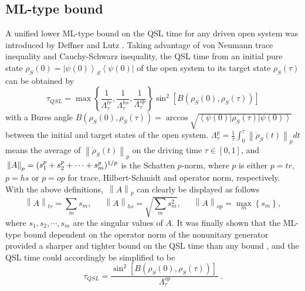 \documentclass[
showpacs,  %
showkeys,  %
aps,       %
amsthm,    %
amsmath,   %
amsfonts,  %
amssymb    %
]{revtex4-1}          %
\begin{document}
\subsection{ML-type bound}
\label{Subsec:31}
A unified lower ML-type bound on the QSL time for any driven open system was introduced by Deffner and Lutz \cite{Deffner2013}. Taking advantage of von Neumann trace inequality and Cauchy-Schwarz inequality, the QSL time from an initial pure state ${\rho _S}(0) = {\left| {\psi (0)} \right\rangle _S}\left\langle {\psi (0)} \right|$ of the open system to its target state ${\rho _S}(\tau)$ can be obtained by
\begin{equation}
\label{e13}
{\tau _{QSL}} = \max \left\{ {\frac{1}{{\Lambda _\tau ^{tr}}},\frac{1}{{\Lambda _\tau ^{hs}}},\frac{1}{{\Lambda _\tau ^{op}}}} \right\}{\sin ^2}\left[ {B({\rho _S}(0),{\rho _S}(\tau ))} \right]
\end{equation}
with a Bures angle $B({\rho _S}(0),{\rho _S}(\tau )) = \arccos \sqrt {\left\langle {\psi (0)} \right|{\rho _S}(\tau )\left| {\psi (0)} \right\rangle }$ between the initial and target states of the open system. $\Lambda _\tau ^p = \frac{1}{\tau }{\int_0^\tau  {\left\| {{{\dot \rho }_S}(t )} \right\|} _p}dt$ means the average of ${\left\| {{{\dot \rho }_S}(t )} \right\|_p}$ on the driving time $\tau  \in \left[ {0,1} \right]$, and $\,{\left\| A \right\|_p} = {(s _1^p + s _2^p +  \cdots  + s _m^p)^{{1 \mathord{\left/{\vphantom {1 p}} \right.\kern-\nulldelimiterspace} p}}}$ is the Schatten $p$-norm, where $p$ is either $p=tr$, $p=hs$ or $p=op$ for trace, Hilbert-Schmidt and operator norm, respectively. With the above definitions, $\,{\left\| A \right\|_p}$ can clearly be displayed as follows
\begin{equation}
\label{e14}
{\left\| A \right\|_{tr}} = \sum\limits_m {{s_m}} ,\,\,\,\,\,\,\,\,\,{\left\| A \right\|_{hs}} = \sqrt {\sum\limits_m {s_m^2} } ,\,\,\,\,\,\,\,\,\,{\left\| A \right\|_{op}} = \mathop {\max }\limits_m \left\{ {{s_m}} \right\},
\end{equation}
where ${s _1},{s _2},\cdots,{s _m}$ are the singular values of $A$. It was finally shown that the ML-type bound dependent on the operator norm of the nonunitary generator provided a sharper and tighter bound on the QSL time than any bound \cite{Deffner2013}, and the QSL time could accordingly be simplified to be
\begin{equation}
\label{e15}
{\tau _{QSL}} = \frac{{{{\sin }^2}\left[ {B({\rho _S}(0),{\rho _S}(\tau ))} \right]\,}}{{\Lambda _\tau ^{op}}}\,.
\end{equation}
\end{document}
